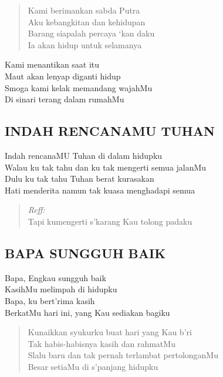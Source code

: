 \begin{verse}
Kami berimankan sabda Putra\\
Aku kebangkitan dan kehidupan\\
Barang siapalah percaya ‘kan daku\\
Ia akan hidup untuk selamanya
\end{verse}

\begin{altverse}
Kami menantikan saat itu\\
Maut akan lenyap diganti hidup\\
Smoga kami kelak memandang wajahMu\\
Di sinari terang dalam rumahMu
\end{altverse}

\subsection{ INDAH RENCANAMU TUHAN}
\begin{altverse}
Indah rencanaMU Tuhan di dalam hidupku\\
Walau ku tak tahu dan ku tak mengerti semua jalanMu\\
Dulu ku tak tahu Tuhan berat kurasakan\\
Hati menderita namun tak kuasa menghadapi semua
\end{altverse}

\begin{verse}
\textit{Reff:}\\
Tapi kumengerti s’karang Kau tolong padaku
\end{verse}

\subsection{ BAPA SUNGGUH BAIK}
\begin{altverse}
Bapa, Engkau sungguh baik\\
KasihMu melimpah di hidupku\\
Bapa, ku bert’rima kasih\\
BerkatMu hari ini, yang Kau sediakan bagiku
\end{altverse}

\begin{verse}
Kunaikkan syukurku buat hari yang Kau b’ri\\
Tak habis-habisnya kasih dan rahmatMu\\
Slalu baru dan tak pernah terlambat pertolonganMu\\
Besar setiaMu di s’panjang hidupku
\end{verse}


